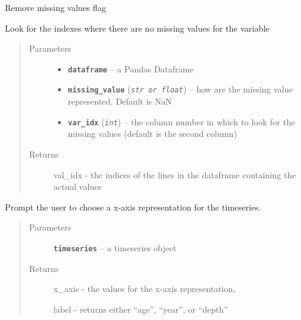 \documentclass[letterpaper,10pt,english]{sphinxmanual}
\begin{document}
\begin{fulllineitems}
\label{LIPDutils:pyleoclim.valuesloc}
Remove missing values flag

Look for the indexes where there are no missing values for the variable
\begin{quote}\begin{description}
\item[{Parameters}] \leavevmode\begin{itemize}
\item {} 
\textbf{\texttt{dataframe}} -- a Pandas Dataframe

\item {} 
\textbf{\texttt{missing\_value}} (\emph{\texttt{str or float}}) -- how are the missing value represented.
Default is NaN

\item {} 
\textbf{\texttt{var\_idx}} (\emph{\texttt{int}}) -- the column number in which to look for the missing
values (default is the second column)

\end{itemize}

\item[{Returns}] \leavevmode
val\_idx - the indices of the lines in the dataframe containing the actual values

\end{description}\end{quote}

\end{fulllineitems}


\begin{fulllineitems}
\label{LIPDutils:pyleoclim.TSOxaxis}
Prompt the user to choose a x-axis representation for the timeseries.
\begin{quote}\begin{description}
\item[{Parameters}] \leavevmode
\textbf{\texttt{timeseries}} -- a timeseries object

\item[{Returns}] \leavevmode

x\_axis - the values for the x-axis representation,

label - returns either ``age'', ``year'', or ``depth''


\end{description}\end{quote}

\end{fulllineitems}
\end{document}
